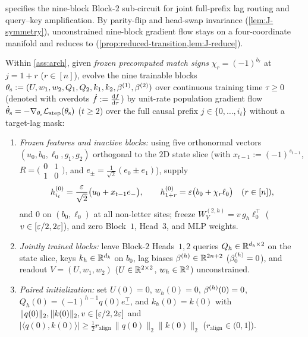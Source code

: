  specifies the nine-block Block-$2$ sub-circuit for joint full-prefix lag routing and query--key amplification. By parity-flip and head-swap invariance (\cref{lem:J-symmetry}), unconstrained nine-block gradient flow stays on a four-coordinate manifold and reduces to \stepode{} (\cref{prop:reduced-transition,lem:J-reduce}).

\begin{definition}
\label{def:gate}
Within \cref{ass:arch}, given \emph{frozen precomputed match signs} $\chi_r = (-1)^{b_r}$ at $j = 1+r$ ($r \in [n]$), evolve the nine trainable blocks $\theta_{\mathrm s} := (U, w_1, w_2, Q_1, Q_2, k_1, k_2, \beta^{(1)}, \beta^{(2)})$ over continuous training time $\tau \ge 0$ (denoted with overdots $\dot f := \ddtau{f}$) by unit-rate population gradient flow $\dot\theta_{\mathrm s} = -\nabla_{\theta_{\mathrm s}}\mathcal L_{\mathrm{step}}(\theta_{\mathrm s})$ ($t \ge 2$) over the full causal prefix $j \in \{0, \ldots, i_t\}$ without a target-lag mask:
\begin{enumerate}[label=(\roman*),leftmargin=*,nosep,topsep=2pt]
\item \emph{Frozen features and inactive blocks:} using five orthonormal vectors $(u_0, b_0, \ell_0, g_1, g_2)$ orthogonal to the $2$D state slice (with $x_{t-1} := (-1)^{s_{t-1}}$, $R = \bigl(\begin{smallmatrix}0&1\\1&0\end{smallmatrix}\bigr)$, and $e_\pm = \frac{1}{\sqrt 2}(e_0 \pm e_1)$), supply
\[
  h^{(0)}_{i_t} = \frac{\varepsilon}{\sqrt 2}\bigl(u_0 + x_{t-1}e_-\bigr), \qquad
  h^{(0)}_{1+r} = \varepsilon\bigl(b_0 + \chi_r\ell_0\bigr) \quad (r \in [n]),
\]
and $0$ on $(b_0, \ell_0)$ at all non-letter sites; freeze $W_V^{(2,h)} = v\,g_h \ell_0^\top$ ($v \in [\varepsilon/2, 2\varepsilon]$), and zero Block~$1$, Head~$3$, and MLP weights.
\item \emph{Jointly trained blocks:} leave Block-$2$ Heads~$1,2$ queries $Q_h \in \mathbb R^{d_k\times 2}$ on the state slice, keys $k_h \in \mathbb R^{d_k}$ on $b_0$, lag biases $\beta^{(h)} \in \mathbb R^{2n+2}$ ($\beta^{(h)}_0 = 0$), and readout $V = (U, w_1, w_2)$ ($U \in \mathbb R^{2\times 2}$, $w_h \in \mathbb R^2$) unconstrained.
\item \emph{Paired initialization:} set $U(0) = 0$, $w_h(0) = 0$, $\beta^{(h)}(0) = 0$, $Q_h(0) = (-1)^{h-1}q(0)e_-^\top$, and $k_h(0) = k(0)$ with $\|q(0)\|_2, \|k(0)\|_2, v \in [\varepsilon/2, 2\varepsilon]$ and $\lvert\langle q(0), k(0)\rangle\rvert \ge \frac{1}{2}r_{\mathrm{align}}\,\|q(0)\|_2\|k(0)\|_2$ ($r_{\mathrm{align}} \in (0,1]$).
\end{enumerate}
\end{definition}

